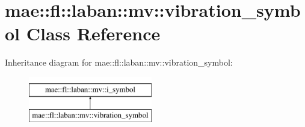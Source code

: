 \hypertarget{classmae_1_1fl_1_1laban_1_1mv_1_1vibration__symbol}{\section{mae\-:\-:fl\-:\-:laban\-:\-:mv\-:\-:vibration\-\_\-symbol Class Reference}
\label{classmae_1_1fl_1_1laban_1_1mv_1_1vibration__symbol}
}
Inheritance diagram for mae\-:\-:fl\-:\-:laban\-:\-:mv\-:\-:vibration\-\_\-symbol\-:\begin{figure}[H]
\begin{center}
\leavevmode
\includegraphics[height=2.000000cm]{classmae_1_1fl_1_1laban_1_1mv_1_1vibration__symbol}
\end{center}
\end{figure}
